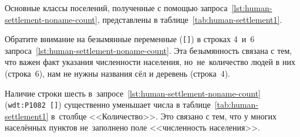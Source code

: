 Основные классы поселений, полученные с помощью запроса~\ref{lst:human-settlement-noname-count}, 
представлены в таблице~\ref{tab:human-settlement1}. 

Обратите внимание на безымянные переменные (\lstinline|[]|) 
в строках 4~и~6 запроса~\ref{lst:human-settlement-noname-count}. 
Эта безымянность связана с тем, что 
важен факт указания численности населения, но~не~количество людей в них (строка~6),  
нам не нужны названия сёл и деревень (строка~4).  

Наличие строки шесть в~запросе~\ref{lst:human-settlement-noname-count} 
(\lstinline|wdt:P1082 []|) 
существенно уменьшает числа в таблице~\ref{tab:human-settlement1} 
в~столбце <<Количество>>. 
Это связано с тем, что у многих населённых пунктов 
не~заполнено поле <<численность населения>>. 



